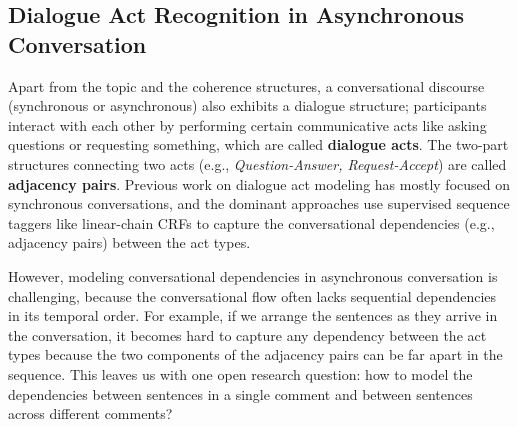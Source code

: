 \documentclass{article} %
\begin{document}
\subsection{Dialogue Act Recognition in Asynchronous Conversation}

Apart from the topic and the coherence structures, a conversational discourse (synchronous or asynchronous) also exhibits a dialogue structure; participants interact with each other by performing certain communicative acts like asking questions or requesting something, which are called \textbf{dialogue acts}. The two-part structures connecting two acts (e.g., \emph{Question-Answer, Request-Accept}) are called \textbf{adjacency pairs}. 
Previous work on dialogue act modeling has mostly focused on synchronous conversations, and the dominant approaches use supervised sequence taggers like linear-chain CRFs to capture the conversational dependencies (e.g., adjacency pairs) between the act types.    



However, modeling conversational dependencies in asynchronous conversation is challenging, because the conversational flow often lacks sequential dependencies in its temporal order. For example, if we arrange the sentences as they arrive in the conversation, it becomes hard to capture any dependency between the act types because the two components of the adjacency pairs can be far apart in the sequence. This leaves us with one open research question: how to model the dependencies between sentences in a single comment and between sentences across different comments? %
\end{document}
